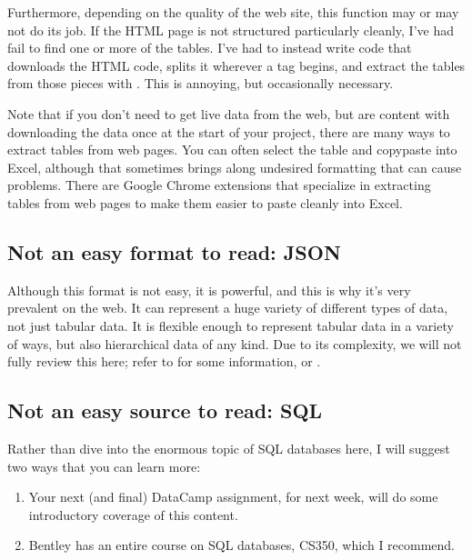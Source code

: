 \documentclass[letterpaper,10pt,english]{sphinxmanual}
\begin{document}
Furthermore, depending on the quality of the web site, this function may or may not do its job.  If the HTML page is not structured particularly cleanly, I’ve had  fail to find one or more of the tables.  I’ve had to instead write code that downloads the HTML code, splits it wherever a  tag begins, and extract the tables from those pieces with .  This is annoying, but occasionally necessary.

Note that if you don’t need to get live data from the web, but are content with downloading the data once at the start of your project, there are many ways to extract tables from web pages.  You can often select the table and copy\sphinxhyphen{}paste into Excel, although that sometimes brings along undesired formatting that can cause problems.  There are Google Chrome extensions that specialize in extracting tables from web pages to make them easier to paste cleanly into Excel.


\subsection{Not an easy format to read: JSON}
\label{\detokenize{chapter-13-etl:not-an-easy-format-to-read-json}}
Although this format is not easy, it is powerful, and this is why it’s very prevalent on the web.  It can represent a huge variety of different types of data, not just tabular data.  It is flexible enough to represent tabular data in a variety of ways, but also hierarchical data of any kind.  Due to its complexity, we will not fully review this here; refer to  for some information, or .


\subsection{Not an easy source to read: SQL}
\label{\detokenize{chapter-13-etl:not-an-easy-source-to-read-sql}}
Rather than dive into the enormous topic of SQL databases here, I will suggest two ways that you can learn more:
\begin{enumerate}
%
\item {} 
Your next (and final) DataCamp assignment, for next week, will do some introductory coverage of this content.

\item {} 
Bentley has an entire course on SQL databases, CS350, which I recommend.

\end{enumerate}
\end{document}
